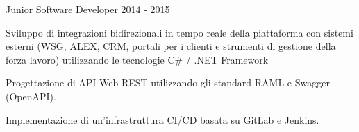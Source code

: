\begin{cventries}
  \cventry
    {Junior Software Developer} %
    {} %
    {} %
    {} %
    {2014 - 2015} %
    {
      \begin{cvitems} %
        \item {Sviluppo di integrazioni bidirezionali in tempo reale della piattaforma con sistemi esterni (WSG, ALEX, CRM, portali per i clienti e strumenti di gestione della forza lavoro) utilizzando le tecnologie C\# / .NET Framework}
        \item {Progettazione di API Web REST utilizzando gli standard RAML e Swagger (OpenAPI).}
        \item {Implementazione di un'infrastruttura CI/CD basata su GitLab e Jenkins.}
      \end{cvitems}
    }

\end{cventries}
